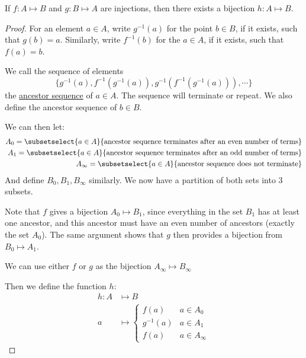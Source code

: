 \documentclass[../Main.tex]{subfiles}
\begin{document}
\begin{theorem}
    \label{thmSchroderBernstein}
    If $f : A \mapsto B$ and $g : B \mapsto A$ are injections, then there exists a bijection $h : A \mapsto B$.
\end{theorem}
\begin{proof}
    For an element $a \in A$, write $g^{-1}(a)$ for the point $b \in B$, if it exists, such that $g(b) = a$. Similarly, write $f^{-1}(b)$ for the $a \in A$, if it exists, such that $f(a) = b$.\par
    We call the sequence of elements 
    \begin{equation*}
        \{g^{-1}(a), f^{-1}(g^{-1}(a)), g^{-1}(f^{-1}(g^{-1}(a))), \cdots\}
    \end{equation*}
    the \underline{ancestor sequence} of $a \in A$. The sequence will terminate or repeat. We also define the ancestor sequence of $b \in B$.\par
    We can then let:
    \begin{eqnarray*}
        A_0 = \subsetselect{a \in A}{\text{ancestor sequence terminates after an even number of terms}} \\
        A_1 = \subsetselect{a \in A}{\text{ancestor sequence terminates after an odd number of terms}} \\
        A_\infty = \subsetselect{a \in A}{\text{ancestor sequence does not terminate}}
    \end{eqnarray*}
    And define $B_0, B_1, B_\infty$ similarly. We now have a partition of both sets into 3 subsets.\par
    Note that $f$ gives a bijection $A_0 \mapsto B_1$, since everything in the set $B_1$ has at least one ancestor, and this ancestor must have an even number of ancestors (exactly the set $A_0$). The same argument shows that $g$ then provides a bijection from $B_0 \mapsto A_1$.\par
    We can use either $f$ or $g$ as the bijection $A_\infty \mapsto B_\infty$\par %
    Then we define the function $h$:
    \begin{align*}
        h : A &\mapsto B \\
        a &\mapsto
        \begin{cases}
            f(a) & a \in A_0 \\
            g^{-1}(a) & a \in A_1 \\
            f(a) & a \in A_\infty
        \end{cases}
    \end{align*}
\end{proof}
\end{document}

